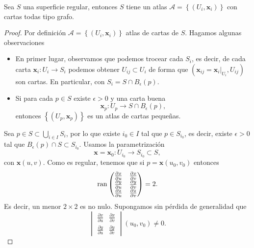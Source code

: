\begin{theorem}
	Sea $\displaystyle S $ una superficie regular, entonces $\displaystyle S $ tiene un atlas $\displaystyle \mathcal{A} = \left\{ \left(U_{i}, \textbf{x} _{i}\right)\right\}  $ con cartas todas tipo grafo.
\end{theorem}
\begin{proof}
	Por definición $\displaystyle \mathcal{A}= \left\{ \left(U_{i}, \textbf{x} _{i}\right)\right\}  $ atlas de cartas de $\displaystyle S $. Hagamos algunas observaciones
	\begin{itemize}
	\item En primer lugar, observamos que podemos trocear cada $\displaystyle S_{i} $, es decir, de cada carta $\displaystyle \textbf{x} _{i} : U_{i} \to S_{i} $ podemos obtener $\displaystyle U_{ij}\subset U_{i} $ de forma que $\displaystyle \left( \textbf{x} _{ij}= \textbf{x} _{i}|_{U_{i}}, U_{ij}\right) $ son cartas. En particular, con $\displaystyle S_{i}= S \cap B_{\epsilon }\left(p\right) $.
	\item Si para cada $\displaystyle p \in S $ existe $\displaystyle \epsilon > 0 $ y una carta buena
		\[ \textbf{x} _{p} : U_{p} \to S \cap B_{\epsilon }\left(p\right) ,\]
		entonces $\displaystyle \left\{ \left(U_{p}, \textbf{x} _{p}\right)\right\}  $ es un atlas de cartas pequeñas. 
	\end{itemize}
	Sea $\displaystyle p \in S \subset \bigcup_{i\in I}S_{i} $, por lo que existe $\displaystyle i_{0}\in I $ tal que $\displaystyle p\in S_{i_{0}} $, es decir, existe $\displaystyle \epsilon > 0 $ tal que $\displaystyle B_{\epsilon }\left(p\right)\cap S \subset S_{i_{0}} $. 
Usamos la parametrización 
\[ \textbf{x} = \textbf{x} _{0} : U_{i_{0}} \to S_{i_{0}} \subset S ,\]
con $\displaystyle \textbf{x} \left(u,v\right) $. Como es regular, tenemos que si $\displaystyle p = \textbf{x} \left(u_{0}, v_{0}\right) $ entonces
\[\operatorname{ran}\begin{pmatrix} \frac{\partial x}{\partial u} & \frac{\partial x}{\partial v} \\ \frac{\partial y}{\partial u} & \frac{\partial y}{\partial v} \\ \frac{\partial z}{\partial u} & \frac{\partial z}{\partial v} \end{pmatrix}=2 .\]
Es decir, un menor $\displaystyle 2 \times 2 $ es no nulo. Supongamos sin pérdida de generalidad que 
\[ \begin{vmatrix} \frac{\partial x}{\partial u} & \frac{\partial x}{\partial v} \\ \frac{\partial y}{\partial u} & \frac{\partial y}{\partial v} \end{vmatrix} \left(u_{0}, v_{0}\right)\neq 0 .\]

\end{proof}
